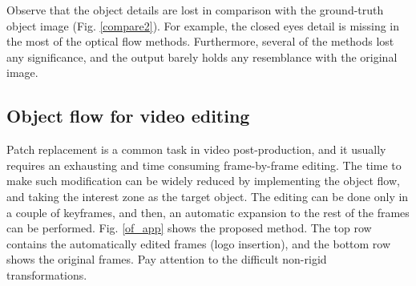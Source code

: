 Observe that the object details are lost in comparison with the ground-truth object image (Fig. \ref{compare2}). For example, the closed eyes detail is missing in the most of the optical 
flow methods. Furthermore, several of the methods lost any significance, and the output barely holds any resemblance with the original image.


\subsection{Object flow for video editing}

Patch replacement is a common task in video post-production, and it usually requires 
an exhausting and time consuming frame-by-frame editing. The time to make such modification can be 
widely reduced by implementing the object flow, and taking the interest zone as the target object. The editing can be done 
only in a couple of keyframes, and then, an automatic expansion to the rest of the frames can be performed. Fig. \ref{of_app} 
shows the proposed method. The top row contains the automatically edited frames (logo insertion), and the bottom row shows the 
original frames. Pay attention to the difficult non-rigid transformations.


